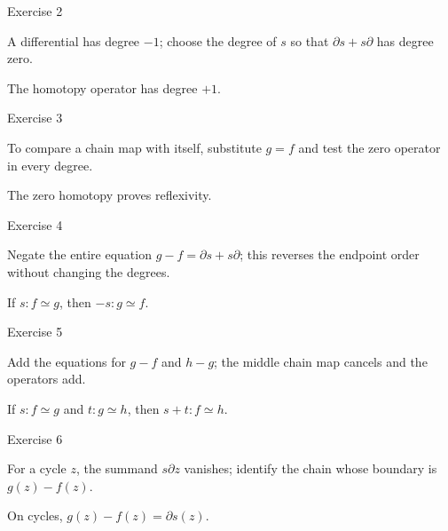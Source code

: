 \begin{exercise}\label{exr:viii22-02}
Exercise 2
\end{exercise}
\begin{hint}
A differential has degree \(-1\); choose the degree of \(s\) so that \(\partial s+s\partial\) has degree zero.
\end{hint}
\begin{solution}
The homotopy operator has degree \(+1\).
\end{solution}

\begin{exercise}\label{exr:viii22-03}
Exercise 3
\end{exercise}
\begin{hint}
To compare a chain map with itself, substitute \(g=f\) and test the zero operator in every degree.
\end{hint}
\begin{solution}
The zero homotopy proves reflexivity.
\end{solution}

\begin{exercise}\label{exr:viii22-04}
Exercise 4
\end{exercise}
\begin{hint}
Negate the entire equation \(g-f=\partial s+s\partial\); this reverses the endpoint order without changing the degrees.
\end{hint}
\begin{solution}
If \(s:f\simeq g\), then \(-s:g\simeq f\).
\end{solution}

\begin{exercise}\label{exr:viii22-05}
Exercise 5
\end{exercise}
\begin{hint}
Add the equations for \(g-f\) and \(h-g\); the middle chain map cancels and the operators add.
\end{hint}
\begin{solution}
If \(s:f\simeq g\) and \(t:g\simeq h\), then \(s+t:f\simeq h\).
\end{solution}

\begin{exercise}\label{exr:viii22-06}
Exercise 6
\end{exercise}
\begin{hint}
For a cycle \(z\), the summand \(s\partial z\) vanishes; identify the chain whose boundary is \(g(z)-f(z)\).
\end{hint}
\begin{solution}
On cycles, \(g(z)-f(z)=\partial s(z)\).
\end{solution}

